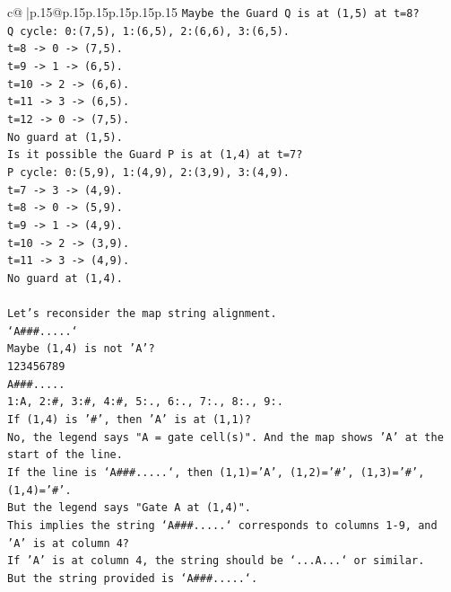 \documentclass{article}
\begin{document}
{\begin{supertabular}{c@{$\;$}|p{.15\linewidth}@{}p{.15\linewidth}p{.15\linewidth}p{.15\linewidth}p{.15\linewidth}p{.15\linewidth}}
{{{\texttt{Maybe the Guard Q is at (1,5) at t=8?} \\
\texttt{Q cycle: 0:(7,5), 1:(6,5), 2:(6,6), 3:(6,5).} \\
\texttt{t=8 {-}> 0 {-}> (7,5).} \\
\texttt{t=9 {-}> 1 {-}> (6,5).} \\
\texttt{t=10 {-}> 2 {-}> (6,6).} \\
\texttt{t=11 {-}> 3 {-}> (6,5).} \\
\texttt{t=12 {-}> 0 {-}> (7,5).} \\
\texttt{No guard at (1,5).} \\
\texttt{Is it possible the Guard P is at (1,4) at t=7?} \\
\texttt{P cycle: 0:(5,9), 1:(4,9), 2:(3,9), 3:(4,9).} \\
\texttt{t=7 {-}> 3 {-}> (4,9).} \\
\texttt{t=8 {-}> 0 {-}> (5,9).} \\
\texttt{t=9 {-}> 1 {-}> (4,9).} \\
\texttt{t=10 {-}> 2 {-}> (3,9).} \\
\texttt{t=11 {-}> 3 {-}> (4,9).} \\
\texttt{No guard at (1,4).} \\
\\ 
\texttt{Let's reconsider the map string alignment.} \\
\texttt{`A\#\#\#.....`} \\
\texttt{Maybe (1,4) is not 'A'?} \\
\texttt{123456789} \\
\texttt{A\#\#\#.....} \\
\texttt{1:A, 2:\#, 3:\#, 4:\#, 5:., 6:., 7:., 8:., 9:.} \\
\texttt{If (1,4) is '\#', then 'A' is at (1,1)?} \\
\texttt{No, the legend says "A = gate cell(s)". And the map shows 'A' at the start of the line.} \\
\texttt{If the line is `A\#\#\#.....`, then (1,1)='A', (1,2)='\#', (1,3)='\#', (1,4)='\#'.} \\
\texttt{But the legend says "Gate A at (1,4)".} \\
\texttt{This implies the string `A\#\#\#.....` corresponds to columns 1{-}9, and 'A' is at column 4?} \\
\texttt{If 'A' is at column 4, the string should be `...A...` or similar.} \\
\texttt{But the string provided is `A\#\#\#.....`.} \\
}}}
\end{supertabular}}
\end{document}
